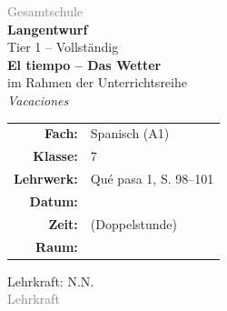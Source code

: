 \documentclass[11pt,a4paper]{article}
\newcommand{\fach}{Spanisch}
\newcommand{\jahrgangsstufe}{7}
\newcommand{\schulart}{Gesamtschule}
\newcommand{\stundenthema}{El tiempo -- Das Wetter}
\newcommand{\reihenthema}{Vacaciones}
\newcommand{\lehrkraft}{N.N.}
\newcommand{\ausbildungsstand}{Lehrkraft}
\newcommand{\gerniveau}{A1}
\newcommand{\lehrwerk}{Qué pasa 1}
\newcommand{\lehrwerkseite}{S. 98--101}
\begin{document}
\begin{titlepage}
    \centering
    \vspace*{2cm}

    {\large\textcolor{gray}{\schulart}}\\[2cm]

    {\Huge\textcolor{fach}{\textbf{Langentwurf}}}\\[0.5cm]
    {\large Tier 1 -- Vollständig}\\[2cm]

    {\LARGE\textbf{\stundenthema}}\\[0.5cm]
    {\large im Rahmen der Unterrichtsreihe}\\[0.3cm]
    {\Large\textit{\reihenthema}}\\[2cm]

    \begin{tabular}{rl}
        \textbf{Fach:} & \fach{} (\gerniveau) \\[0.3cm]
        \textbf{Klasse:} & \jahrgangsstufe \\[0.3cm]
        \textbf{Lehrwerk:} & \lehrwerk, \lehrwerkseite \\[0.3cm]
        \textbf{Datum:} & \underline{\hspace{3cm}} \\[0.3cm]
        \textbf{Zeit:} & \underline{\hspace{3cm}} (Doppelstunde) \\[0.3cm]
        \textbf{Raum:} & \underline{\hspace{3cm}} \\[0.3cm]
    \end{tabular}

    \vfill

    {\large Lehrkraft: \lehrkraft}\\[0.3cm]
    {\normalsize\textcolor{gray}{\ausbildungsstand}}\\[1cm]

\end{titlepage}

\tableofcontents
\newpage

\end{document}
